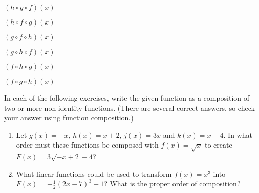 \documentclass[12pt]{book}
\theoremstyle{definition}
\begin{document}
\begin{enumerate}[resume]
\begin{multicols}{3}
\item $(h\circ g \circ f)(x)$
\item $(h\circ f \circ g)(x)$
\item $(g\circ f \circ h)(x)$
\end{multicols}

\begin{multicols}{3}
\item $(g\circ h \circ f)(x)$ 
\item $(f\circ h \circ g)(x)$
\item $(f\circ g \circ h)(x)$
\end{multicols}
\end{enumerate}
\newpage
In each of the following exercises,  write the given function as a composition of two or more non-identity functions.  (There are several correct answers, so check your answer using function composition.)

\begin{enumerate}[resume]





\item Let $g(x) = -x, \, h(x) = x + 2, \, j(x) = 3x$ and $k(x) = x - 4$.  In what order must these functions be composed with $f(x) = \sqrt{x}$ to create $F(x) = 3\sqrt{-x + 2} - 4$?
\item What linear functions could be used to transform $f(x) = x^{3}$ into\\ $F(x) = -\frac{1}{2}(2x - 7)^{3} + 1$?  What is the proper order of composition?
\end{enumerate}
\end{document}
